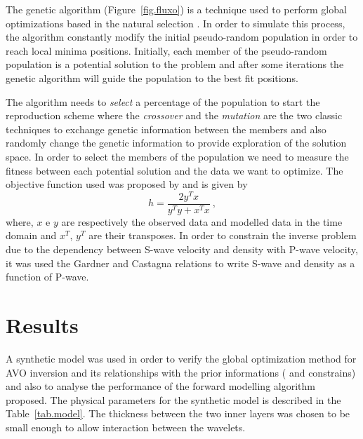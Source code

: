 \documentclass{vie16}
\begin{document}
The genetic algorithm (Figure~\ref{fig.fluxo}) is a technique used to perform 
global optimizations based in the natural selection \citep{Holland1975}. In 
order to simulate this process, the algorithm constantly modify the initial 
pseudo-random population in order to reach local minima positions. 
Initially, each member of the pseudo-random population is a potential 
solution to the problem and after some iterations the genetic algorithm will 
guide the population to the best fit positions.

The algorithm needs to \textit{select} a percentage of the population to start 
the reproduction scheme where the \textit{crossover} and the 
\textit{mutation} are the two classic techniques to exchange genetic 
information between the members and also randomly change the genetic 
information to provide exploration of the solution space. In order to select 
the members of the population we need to measure the fitness between each 
potential solution and the data we want to optimize. The objective function 
used was proposed by \cite{Porsani2000} and is given by
\begin{equation}
h = \frac{2y^{T} x} {y^{T}y + x^{T}x} \ ,
\label{eq.Porsani}
\end{equation}
where, $x$ e $y$ are respectively the observed data and modelled data in 
the time domain and  $x^{T}$, $y^{T}$ are their transposes. In order to 
constrain the inverse problem due to the dependency between S-wave 
velocity and density with P-wave velocity, it was used the Gardner 
\citep{Gardner1974} and Castagna \citep{Castagna1985} relations 
to write S-wave and density as a function of P-wave.

\section{Results}
A synthetic model was used in order to verify the global optimization 
method for AVO inversion and its relationships with the prior informations 
(\cite{Gardner1974} and \cite{Castagna1985} constrains) and also to 
analyse the performance of the forward modelling algorithm proposed. The 
physical parameters for the synthetic model is described in the 
Table~\ref{tab.model}. The thickness between the two inner layers was 
chosen to be small enough to allow interaction between the wavelets.
\end{document}
